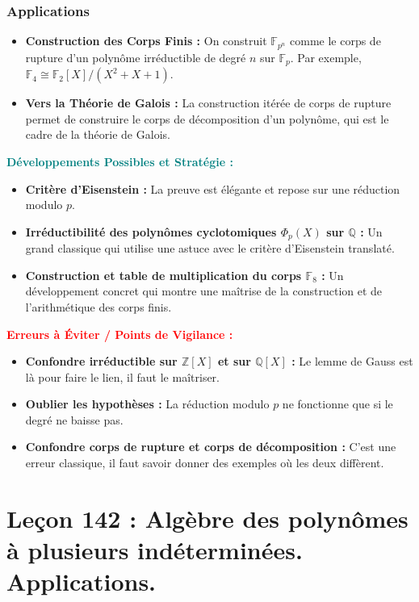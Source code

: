 \documentclass[12pt, a4paper, parskip=full]{report}
\theoremstyle{agregstyle}
\newenvironment{developpements}
  {\par\medskip\noindent\begin{oframed}\noindent\textbf{\textcolor{teal}{Développements Possibles et Stratégie :}}}
  {\end{oframed}\par\medskip}
\newenvironment{erreurs}
  {\par\medskip\noindent\begin{oframed}\noindent\textbf{\textcolor{red}{Erreurs à Éviter / Points de Vigilance :}}}
  {\end{oframed}\par\medskip}
\begin{document}
\subsection{Applications}
\begin{itemize}
    \item \textbf{Construction des Corps Finis :} On construit $\mathbb{F}_{p^n}$ comme le corps de rupture d'un polynôme irréductible de degré $n$ sur $\mathbb{F}_p$. Par exemple, $\mathbb{F}_4 \cong \mathbb{F}_2[X]/(X^2+X+1)$.
    \item \textbf{Vers la Théorie de Galois :} La construction itérée de corps de rupture permet de construire le corps de décomposition d'un polynôme, qui est le cadre de la théorie de Galois.
\end{itemize}

\begin{developpements}
    \begin{itemize}
        \item \textbf{Critère d'Eisenstein :} La preuve est élégante et repose sur une réduction modulo $p$.
        \item \textbf{Irréductibilité des polynômes cyclotomiques $\Phi_p(X)$ sur $\mathbb{Q}$ :} Un grand classique qui utilise une astuce avec le critère d'Eisenstein translaté.
        \item \textbf{Construction et table de multiplication du corps $\mathbb{F}_8$ :} Un développement concret qui montre une maîtrise de la construction et de l'arithmétique des corps finis.
    \end{itemize}
\end{developpements}

\begin{erreurs}
    \begin{itemize}
        \item \textbf{Confondre irréductible sur $\mathbb{Z}[X]$ et sur $\mathbb{Q}[X]$ :} Le lemme de Gauss est là pour faire le lien, il faut le maîtriser.
        \item \textbf{Oublier les hypothèses :} La réduction modulo $p$ ne fonctionne que si le degré ne baisse pas.
        \item \textbf{Confondre corps de rupture et corps de décomposition :} C'est une erreur classique, il faut savoir donner des exemples où les deux diffèrent.
    \end{itemize}
\end{erreurs}
\chapter{Leçon 142 : Algèbre des polynômes à plusieurs indéterminées. Applications.}
\end{document}
